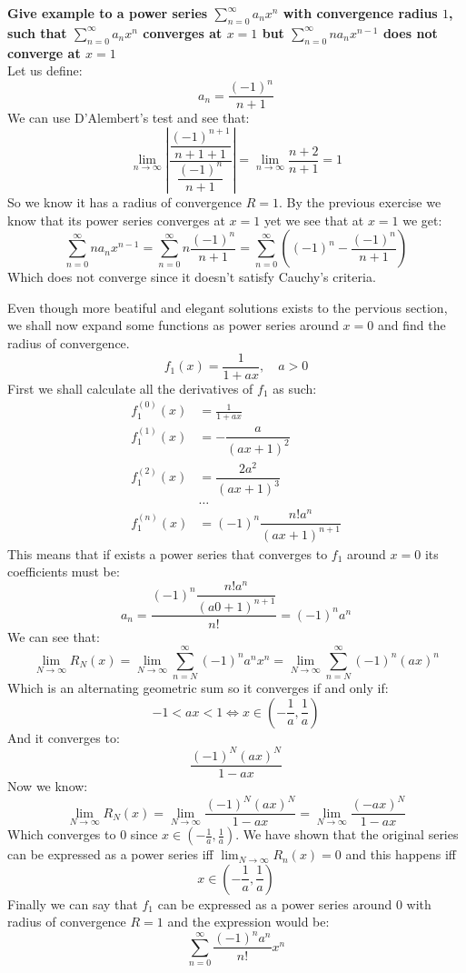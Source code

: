 \documentclass[11pt,a4paper]{article}
\begin{document}
	\newpage
	
	\textbf{Give example to a power series $\sum_{n=0}^{\infty}{a_n x^n}$ 
	with convergence radius $1$, such that $\sum_{n=0}^{\infty}{a_n x^n}$ 
	converges at $x=1$ but $\sum_{n=0}^{\infty}{n a_n x^{n-1}}$ does not 
	converge at $x=1$} \\
	Let us define:
	\[
		a_n = \frac{(-1)^n}{n+1}
	\]
	We can use D'Alembert's test and see that:
	\[
		\lim_{n\to\infty}
		{
			\left\vert
			\dfrac{\dfrac{(-1)^{n+1}}{n+1+1}}{\dfrac{(-1)^n}{n+1}}
			\right\vert
		} = 
		\lim_{n\to\infty}
		{
			\dfrac{n+2}{n+1}
		} = 1
	\]
	So we know it has a radius of convergence $R = 1$. By the previous
	exercise we know that its power series converges at $x = 1$ yet we see 
	that at $x=1$ we get:
	\[
		\sum_{n=0}^{\infty}{n a_n x^{n-1}} = 
		\sum_{n=0}^{\infty}{n \frac{(-1)^n}{n+1}} = 
		\sum_{n=0}^{\infty}{\left((-1)^n - \frac{(-1)^n}{n+1}\right)}
	\]
	Which does not converge since it doesn't satisfy Cauchy's criteria.
	
	\newpage
	
	Even though more beatiful and elegant solutions exists to the pervious
	section, we shall now expand some functions as power series around $x=0$
	and find the radius of convergence.
	\[
		f_1(x) = \frac{1}{1+ax},\quad a > 0
	\]
	First we shall calculate all the derivatives of $f_1$ as such:
	\begin{align*}
		f^{(0)}_1(x) &= \frac{1}{1+ax} \\
		f^{(1)}_1(x) &= -\dfrac{a}{\left(ax+1\right)^2} \\
		f^{(2)}_1(x) &= \dfrac{2a^2}{\left(ax+1\right)^3} \\
		&\dots \\
		f^{(n)}_1(x) &= (-1)^n \dfrac{n! a^{n}}{\left(ax+1\right)^{n+1}}
	\end{align*}
	This means that if exists a power series that converges to $f_1$ around
	$x = 0$ its coefficients must be:
	\[
		a_n = 
		\frac{(-1)^n \dfrac{n! a^{n}}{\left(a0+1\right)^{n+1}}}{n!} = 
		(-1)^n a^n
	\]
	We can see that:
	\[
		\lim_{N\to\infty}{R_N(x)} = 
		\lim_{N\to\infty}
		{\sum_{n=N}^{\infty}{(-1)^n a^n x^n}} = 
		\lim_{N\to\infty}
		{\sum_{n=N}^{\infty}{(-1)^n (ax)^n}}
	\]
	Which is an alternating geometric sum so it converges if and only if:
	\[
		-1 < ax < 1 \iff x\in \left(-\frac{1}{a},\frac{1}{a}\right)
	\]
	And it converges to:
	\[
		\frac{(-1)^N (ax)^N}{1-ax}
	\]
	Now we know:
	\[
		\lim_{N\to\infty}{R_N(x)} = 
		\lim_{N\to\infty}{\frac{(-1)^N (ax)^N}{1-ax}} = 
		\lim_{N\to\infty}{\frac{(-ax)^N}{1-ax}}
	\]
	Which converges to $0$ since $x\in \left(-\frac{1}{a},\frac{1}{a}\right)$.
	We have shown that the original series can be expressed as a power
	series iff $\lim_{N\to\infty}{R_n(x)} = 0$ and this happens iff
	\[
		x\in\left(-\frac{1}{a}, \frac{1}{a}\right)
	\]
	Finally we can say that $f_1$ can be expressed as a power series around 
	$0$ with radius of convergence $R = 1$ and the expression would be:
	\[
		\sum_{n=0}^{\infty}{\frac{(-1)^n a^n}{n!}x^n}
	\]
	
\end{document}
